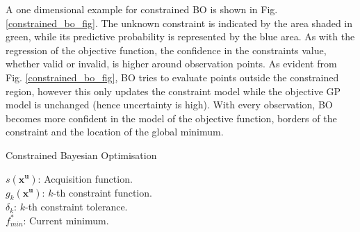 \documentclass[shortAfour,sageh,times]{sagej_no_sage}
\newlength\mylen
\newcommand\myinput[1]{%
  \settowidth\mylen{\KwIn{}}%
  \setlength\hangindent{\mylen}%
  \hspace*{\mylen}#1\\}
\begin{document}
A one dimensional example for constrained BO is shown in Fig. \ref{constrained_bo_fig}. The unknown constraint is indicated by the area shaded in green, while its predictive probability is represented by the blue area. As with the regression of the objective function, the confidence in the constraints value, whether valid or invalid, is higher around observation points. As evident from Fig. \ref{constrained_bo_fig}, BO tries to evaluate points outside the constrained region, however this only updates the constraint model while the objective GP model is unchanged (hence uncertainty is high). With every observation, BO becomes more confident in the model of the objective function, borders of the constraint and the location of the global minimum.
\begin{algorithm}[bt]
	\caption{Constrained Bayesian Optimisation}
	\label{Constrained_BO_algo}
	\DontPrintSemicolon
	\myinput{${s(\boldsymbol{x}^{\boldsymbol{u}})}$: Acquisition function.}
	\myinput{${g_k(\boldsymbol{x}^{\boldsymbol{u}})}$: $k$-th constraint function.}
    \myinput{$\delta_k$: $k$-th constraint tolerance.}
	\myinput{$f^*_{min}$: Current minimum.}
\end{algorithm}
\end{document}
